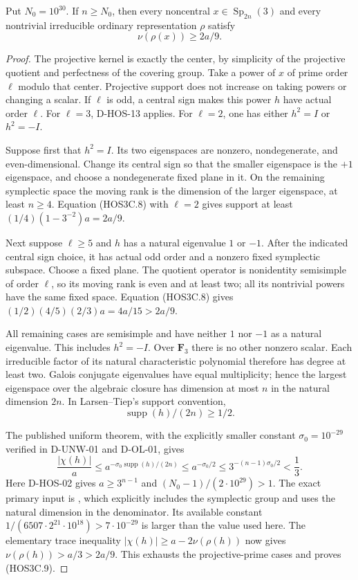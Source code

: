 \begin{lemma}
\label{D-HOS-14}
Put $N_0=10^{30}$. If $n\ge N_0$, then every noncentral
$x\in\operatorname{Sp}_{2n}(3)$ and every nontrivial irreducible
ordinary representation $\rho$ satisfy
\[
                            \nu(\rho(x))\ge2a/9.
 \tag{HOS3C.9}
\]
\end{lemma}

\begin{proof}
The projective kernel is exactly the center, by simplicity of the
projective quotient and perfectness of the covering group. Take a
power of $x$ of prime order $\ell$ modulo that center. Projective
support does not increase on taking powers or changing a scalar.
If $\ell$ is odd, a central sign makes this power $h$ have actual
order $\ell$. For $\ell=3$, D-HOS-13 applies. For $\ell=2$,
one has either $h^2=I$ or $h^2=-I$.

Suppose first that $h^2=I$. Its two eigenspaces are nonzero,
nondegenerate, and even-dimensional. Change its central sign so
that the smaller eigenspace is the $+1$ eigenspace, and choose a
nondegenerate fixed plane in it. On the remaining symplectic space
the moving rank is the dimension of the larger eigenspace, at least
$n\ge4$. Equation (HOS3C.8) with $\ell=2$ gives support at least
$(1/4)(1-3^{-2})a=2a/9$.

Next suppose $\ell\ge5$ and $h$ has a natural eigenvalue $1$ or
$-1$. After the indicated central sign choice, it has actual odd
order and a nonzero fixed symplectic subspace. Choose a fixed plane.
The quotient operator is nonidentity semisimple of order $\ell$,
so its moving rank is even and at least two; all its nontrivial
powers have the same fixed space. Equation (HOS3C.8) gives
$(1/2)(4/5)(2/3)a=4a/15>2a/9$.

All remaining cases are semisimple and have neither $1$ nor $-1$
as a natural eigenvalue. This includes $h^2=-I$. Over $\mathbf F_3$
there is no other nonzero scalar. Each irreducible factor of its
natural characteristic polynomial therefore has degree at least
two. Galois conjugate eigenvalues have equal multiplicity; hence
the largest eigenspace over the algebraic closure has dimension at
most $n$ in the natural dimension $2n$. In Larsen--Tiep's support
convention,
\[
                      \operatorname{supp}(h)/(2n)\ge1/2.
 \tag{HOS3C.10}
\]

The published uniform theorem, with the explicitly smaller constant
$\sigma_0=10^{-29}$ verified in D-UNW-01 and D-OL-01, gives
\[
 \frac{|\chi(h)|}{a}\le a^{-\sigma_0\operatorname{supp}(h)/(2n)}
 \le a^{-\sigma_0/2}
 \le3^{-(n-1)\sigma_0/2}<\frac13.
 \tag{HOS3C.11}
\]
Here D-HOS-02 gives $a\ge3^{n-1}$ and
$(N_0-1)/(2\cdot10^{29})>1$. The exact primary input is
\cite[Theorem~5.5 and complete proof, accepted-author pp.~25--26]
{UNW:LT2024}, which explicitly includes the symplectic group and
uses the natural dimension in the denominator. Its available constant
$1/(6507\cdot2^{21}\cdot10^{18})>7\cdot10^{-29}$ is larger
than the value used here. The elementary trace inequality
$|\chi(h)|\ge a-2\nu(\rho(h))$ now gives
$\nu(\rho(h))>a/3>2a/9$. This exhausts the projective-prime
cases and proves (HOS3C.9).
\end{proof}


